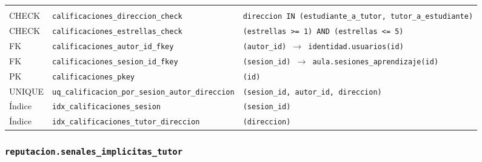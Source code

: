 {\small
\begin{xltabular}{\textwidth}{@{}>{\raggedright\arraybackslash}p{1.7cm} >{\raggedright\arraybackslash}p{4.6cm} L@{}}
    \toprule
     &  &  \\
    \midrule
    \endfirsthead
    \toprule
     &  &  \\
    \midrule
    \endhead
    \bottomrule
    \endfoot
    CHECK & \texttt{calificaciones\_\allowbreak{}direccion\_\allowbreak{}check} & \texttt{direccion IN (\allowbreak{}\textquotesingle{}estudiante\_\allowbreak{}a\_\allowbreak{}tutor\textquotesingle{},\allowbreak{} \textquotesingle{}tutor\_\allowbreak{}a\_\allowbreak{}estudiante\textquotesingle{})} \\
    CHECK & \texttt{calificaciones\_\allowbreak{}estrellas\_\allowbreak{}check} & \texttt{(\allowbreak{}estrellas \textgreater{}= 1) AND (\allowbreak{}estrellas \textless{}= 5)} \\
    FK & \texttt{calificaciones\_\allowbreak{}autor\_\allowbreak{}id\_\allowbreak{}fkey} & \texttt{(\allowbreak{}autor\_\allowbreak{}id) $\rightarrow$ identidad.usuarios(\allowbreak{}id)} \\
    FK & \texttt{calificaciones\_\allowbreak{}sesion\_\allowbreak{}id\_\allowbreak{}fkey} & \texttt{(\allowbreak{}sesion\_\allowbreak{}id) $\rightarrow$ aula.sesiones\_\allowbreak{}aprendizaje(\allowbreak{}id)} \\
    PK & \texttt{calificaciones\_\allowbreak{}pkey} & \texttt{(\allowbreak{}id)} \\
    UNIQUE & \texttt{uq\_\allowbreak{}calificacion\_\allowbreak{}por\_\allowbreak{}sesion\_\allowbreak{}autor\_\allowbreak{}direccion} & \texttt{(\allowbreak{}sesion\_\allowbreak{}id,\allowbreak{} autor\_\allowbreak{}id,\allowbreak{} direccion)} \\
    Índice & \texttt{idx\_\allowbreak{}calificaciones\_\allowbreak{}sesion} & \texttt{(\allowbreak{}sesion\_\allowbreak{}id)} \\
    Índice & \texttt{idx\_\allowbreak{}calificaciones\_\allowbreak{}tutor\_\allowbreak{}direccion} & \texttt{(\allowbreak{}direccion)} \\
\end{xltabular}
}

\subsubsection{\texorpdfstring{\texttt{reputacion.senales\_\allowbreak{}implicitas\_\allowbreak{}tutor}}{reputacion.senales\_implicitas\_tutor}}\label{dd:reputacion.senales_implicitas_tutor}

